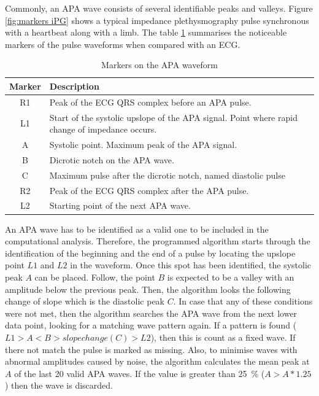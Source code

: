 Commonly, an APA wave consists of several identifiable peaks and valleys. Figure \ref{fig:markers iPG} shows a typical impedance plethysmography pulse synchronous with a heartbeat along with a limb. The table \ref{tbl:APA markers} summarises the noticeable markers of the pulse waveforms when compared with an ECG.

\begin{table}[!htpb]
	\caption{Markers on the APA waveform}
	\label{tbl:APA markers}
	\centering
	\begin{tabular}{c p{10cm}}
		\textbf{Marker} & \textbf{Description} \\
		\toprule 
		R1 & Peak of the ECG QRS complex before an APA pulse. \\ 
		L1 & Start of the systolic upslope of the APA signal. Point where  rapid change of impedance occurs. \\ 
		A & Systolic point. Maximum peak of the APA signal.  \\ 
		B & Dicrotic notch on the APA wave. \\ 
		C & Maximum pulse after the dicrotic notch, named diastolic pulse  \\ 
		R2 & Peak of the ECG QRS complex after the APA pulse.  \\ 
		L2 & Starting point of the next APA wave. \\ 
		\bottomrule
	\end{tabular}
\end{table} 

An APA wave has to be identified as a valid one to be included in the computational analysis. Therefore, the programmed algorithm starts through the identification of the beginning and the end of a pulse by locating the upslope point $L1$ and $L2$ in the waveform. Once this spot has been identified, the systolic peak $A$ can be placed. Follow, the point $B$ is expected to be a valley with an amplitude below the previous peak. Then, the algorithm looks the following change of slope which is the diastolic peak $C$. In case that any of these conditions were not met, then the algorithm searches the APA wave from the next lower data point, looking for a matching wave pattern again. If a pattern is found ($L1 > A < B > slope change (C) > L2$), then this is count as a fixed wave. If there not match the pulse is marked as missing. Also, to minimise waves with abnormal amplitudes caused by noise, the algorithm calculates the mean peak at $A$ of the last 20 valid APA waves. If the value is greater than \SI{25}{\percent} ($A > A*1.25$) then the wave is discarded.  

